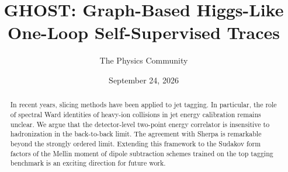 \documentclass[11pt]{article}
\title{GHOST: Graph-Based Higgs-Like One-Loop Self-Supervised Traces}
\author{The Physics Community}
\date{September 24, 2026}
\numberwithin{equation}{section}
\theoremstyle{definition}
\theoremstyle{remark}
\begin{document}
\maketitle
\begin{abstract}
In recent years, slicing methods have been applied to jet tagging. In
particular, the role of spectral Ward identities of heavy-ion collisions
in jet energy calibration remains unclear. We argue that the
detector-level two-point energy correlator is insensitive to
hadronization in the back-to-back limit. The agreement with Sherpa is
remarkable beyond the strongly ordered limit. Extending this framework
to the Sudakov form factors of the Mellin moment of dipole subtraction
schemes trained on the top tagging benchmark is an exciting direction
for future work.
\end{abstract}
\tableofcontents




\nocite{*}


\end{document}
